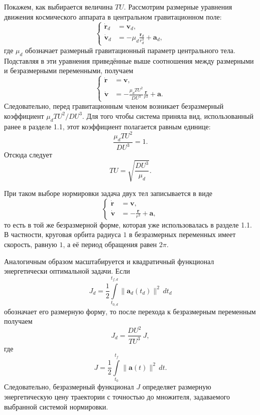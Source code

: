 Покажем, как выбирается величина $TU$. Рассмотрим размерные уравнения движения космического аппарата в центральном гравитационном поле:
\begin{equation}
	\left\{
	\begin{aligned}
		\dot{\mathbf r}_d &= \mathbf v_d,\\
		\dot{\mathbf v}_d &= -\mu_d\frac{\mathbf r_d}{r_d^3}+\mathbf a_d,
	\end{aligned}
	\right.
\end{equation}
где $\mu_d$ обозначает размерный гравитационный параметр центрального тела. Подставляя в эти уравнения приведённые выше соотношения между размерными и безразмерными переменными, получаем
\begin{equation}
	\left\{
	\begin{aligned}
		\dot{\mathbf r} &= \mathbf v,\\
		\dot{\mathbf v} &= -\frac{\mu_dTU^2}{DU^3}\frac{\mathbf r}{r^3}+\mathbf a.
	\end{aligned}
	\right.
\end{equation}
Следовательно, перед гравитационным членом возникает безразмерный коэффициент $\mu_dTU^2/DU^3$. Для того чтобы система приняла вид, использованный ранее в разделе 1.1, этот коэффициент полагается равным единице:
\begin{equation}
	\frac{\mu_dTU^2}{DU^3}=1.
\end{equation}
Отсюда следует
\begin{equation}
	TU=\sqrt{\frac{DU^3}{\mu_d}}.
\end{equation}

При таком выборе нормировки задача двух тел записывается в виде
\begin{equation}
	\left\{
	\begin{aligned}
		\dot{\mathbf r} &= \mathbf v,\\
		\dot{\mathbf v} &= -\frac{\mathbf r}{r^3}+\mathbf a,
	\end{aligned}
	\right.
\end{equation}
то есть в той же безразмерной форме, которая уже использовалась в разделе 1.1. В частности, круговая орбита радиуса $1$ в безразмерных переменных имеет скорость, равную $1$, а её период обращения равен $2\pi$.

Аналогичным образом масштабируется и квадратичный функционал энергетически оптимальной задачи. Если
\begin{equation}
	J_d=\frac{1}{2}\int\limits_{t_{0,d}}^{t_{f,d}}\|\mathbf a_d(t_d)\|^2\,dt_d
\end{equation}
обозначает его размерную форму, то после перехода к безразмерным переменным получаем
\begin{equation}
	J_d=\frac{DU^2}{TU^3}\,J,
\end{equation}
где
\begin{equation}
	J=\frac{1}{2}\int\limits_{t_0}^{t_f}\|\mathbf a(t)\|^2\,dt.
\end{equation}
Следовательно, безразмерный функционал $J$ определяет размерную энергетическую цену траектории с точностью до множителя, задаваемого выбранной системой нормировки.

